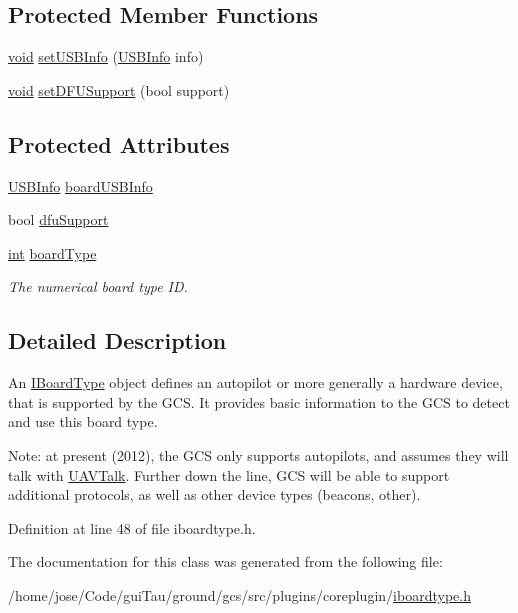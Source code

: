 \subsection*{Protected Member Functions}
\begin{DoxyCompactItemize}
\item 
\hyperlink{group___u_a_v_objects_plugin_ga444cf2ff3f0ecbe028adce838d373f5c}{void} \hyperlink{group___core_plugin_ga42daca6311468f194ca6fe21ba757739}{set\-U\-S\-B\-Info} (\hyperlink{struct_core_1_1_i_board_type_1_1_u_s_b_info}{U\-S\-B\-Info} info)
\item 
\hyperlink{group___u_a_v_objects_plugin_ga444cf2ff3f0ecbe028adce838d373f5c}{void} \hyperlink{group___core_plugin_gac9d8c69a2547553e8129adc61d57714f}{set\-D\-F\-U\-Support} (bool support)
\end{DoxyCompactItemize}
\subsection*{Protected Attributes}
\begin{DoxyCompactItemize}
\item 
\hyperlink{struct_core_1_1_i_board_type_1_1_u_s_b_info}{U\-S\-B\-Info} \hyperlink{group___core_plugin_ga240004d7cf24893e312b4c471e7d18c2}{board\-U\-S\-B\-Info}
\item 
bool \hyperlink{group___core_plugin_gada9001e6e7d55c7cee9b04f37597946c}{dfu\-Support}
\item 
\hyperlink{ioapi_8h_a787fa3cf048117ba7123753c1e74fcd6}{int} \hyperlink{group___core_plugin_gab9cad66a5d315e3e491293c989bc4e5a}{board\-Type}
\begin{DoxyCompactList}\small\item\em The numerical board type I\-D. \end{DoxyCompactList}\end{DoxyCompactItemize}


\subsection{Detailed Description}
An \hyperlink{class_core_1_1_i_board_type}{I\-Board\-Type} object defines an autopilot or more generally a hardware device, that is supported by the G\-C\-S. It provides basic information to the G\-C\-S to detect and use this board type.

Note\-: at present (2012), the G\-C\-S only supports autopilots, and assumes they will talk with \hyperlink{class_u_a_v_talk}{U\-A\-V\-Talk}. Further down the line, G\-C\-S will be able to support additional protocols, as well as other device types (beacons, other). 

Definition at line 48 of file iboardtype.\-h.



The documentation for this class was generated from the following file\-:\begin{DoxyCompactItemize}
\item 
/home/jose/\-Code/gui\-Tau/ground/gcs/src/plugins/coreplugin/\hyperlink{iboardtype_8h}{iboardtype.\-h}\end{DoxyCompactItemize}
